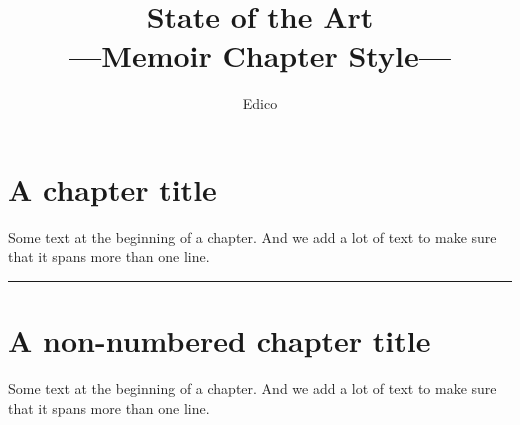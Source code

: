 \documentclass[a5paper,10pt]{memoir}
\begin{document}
\title{\pplbxviii State of the Art\\\Large ---Memoir Chapter Style---}
\author{\pplbcxii Edico}
\date{}
\maketitle
\thispagestyle{empty}
\clearpage

\frontmatter
\tableofcontents


\mainmatter

\chapter{A chapter title}
\pagecolor{blue!5}
\thispagestyle{empty}
\newpage

\pagecolor{white}
Some text at the beginning of a chapter. And we add a lot of text to
make sure that it spans more than one line.
\par\fancybreak{$***$}\par

\chapter*{A non-numbered chapter title}
\pagecolor{yellow!10} %
\thispagestyle{empty}
\newpage

\pagecolor{white}
Some text at the beginning of a chapter. And we add a lot of text to
make sure that it spans more than one line.
\end{document}
